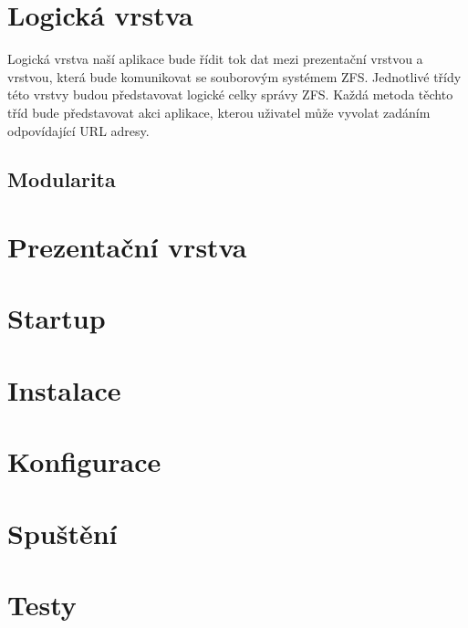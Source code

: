 \section{Logická vrstva}
Logická vrstva naší aplikace bude řídit tok dat mezi prezentační vrstvou a vrstvou, která bude komunikovat se souborovým systémem ZFS. Jednotlivé třídy této vrstvy budou představovat logické celky správy ZFS. Každá metoda těchto tříd bude představovat akci aplikace, kterou uživatel může vyvolat zadáním odpovídající URL adresy.
    \subsection{Modularita}


\section{Prezentační vrstva}
\section{Startup}
\section{Instalace}
\section{Konfigurace}
\section{Spuštění}
\section{Testy}

